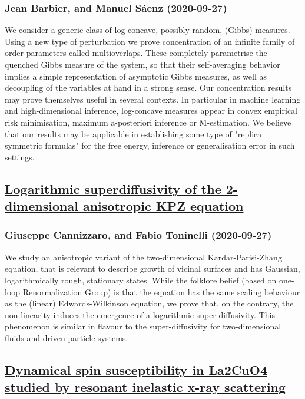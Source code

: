\subsubsection*{Jean Barbier, and Manuel Sáenz (2020-09-27)}
We consider a generic class of log-concave, possibly random, (Gibbs)
measures. Using a new type of perturbation we prove concentration of an
infinite family of order parameters called multioverlaps. These completely
parametrise the quenched Gibbs measure of the system, so that their
self-averaging behavior implies a simple representation of asymptotic Gibbs
measures, as well as decoupling of the variables at hand in a strong sense. Our
concentration results may prove themselves useful in several contexts. In
particular in machine learning and high-dimensional inference, log-concave
measures appear in convex empirical risk minimisation, maximum a-posteriori
inference or M-estimation. We believe that our results may be applicable in
establishing some type of "replica symmetric formulas" for the free energy,
inference or generalisation error in such settings.

\subsection*{\href{http://arxiv.org/abs/2009.12934v1}{Logarithmic superdiffusivity of the 2-dimensional anisotropic KPZ  equation}}
\subsubsection*{Giuseppe Cannizzaro, and Fabio Toninelli (2020-09-27)}
We study an anisotropic variant of the two-dimensional Kardar-Parisi-Zhang
equation, that is relevant to describe growth of vicinal surfaces and has
Gaussian, logarithmically rough, stationary states. While the folklore belief
(based on one-loop Renormalization Group) is that the equation has the same
scaling behaviour as the (linear) Edwards-Wilkinson equation, we prove that, on
the contrary, the non-linearity induces the emergence of a logarithmic
super-diffusivity. This phenomenon is similar in flavour to the
super-diffusivity for two-dimensional fluids and driven particle systems.

\subsection*{\href{http://arxiv.org/abs/2009.12925v1}{Dynamical spin susceptibility in La2CuO4 studied by resonant inelastic  x-ray scattering}}
